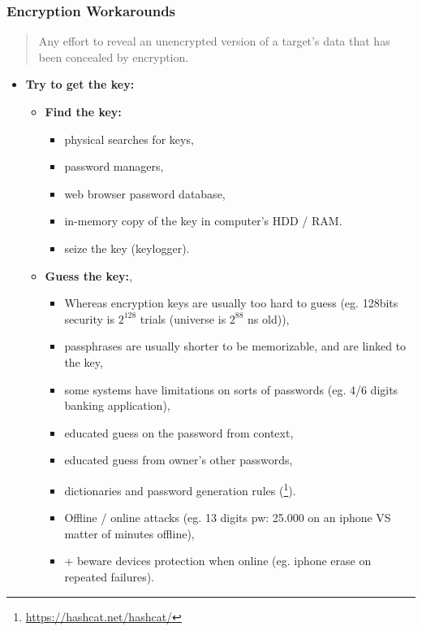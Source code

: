 \documentclass{beamer}
\begin{document}
\begin{frame}[allowframebreaks]
        \frametitle{Encryption Workarounds~\cite{kerr2017}}
        \begin{quote}
          Any effort to reveal an unencrypted version of a target's data that
          has been concealed by encryption.
        \end{quote}
        \begin{itemize}
          \item {\bf Try to get the key:}
          \begin{itemize}
        \item {\bf Find the key:} 
          \begin{itemize}
          \item physical searches for keys,
          \item password managers,
          \item web browser password database,
          \item in-memory copy of the key in computer's HDD / RAM.
          \item seize the key (keylogger).
          \end{itemize}
        \item {\bf Guess the key:},
          \begin{itemize}
            \item Whereas encryption keys are usually too hard to guess (eg.
              128bits security is $2^{128}$ trials (universe is $2^{88}$ ns old)),
            \item passphrases are usually shorter to be memorizable, and are
              linked to the key,
            \item some systems have limitations on sorts of passwords (eg. 4/6
              digits banking application),
            \item educated guess on the password from context,
            \item educated guess from owner's other passwords,
            \item dictionaries and password generation rules (\footnote{\url{https://hashcat.net/hashcat/}}).
            \item Offline / online attacks (eg. 13 digits pw: 25.000 on an
              iphone VS matter of minutes offline),
            \item + beware devices protection when online (eg. iphone erase on repeated failures).
          \end{itemize}
         

\end{itemize}
\end{itemize}
\end{frame}
\end{document}
